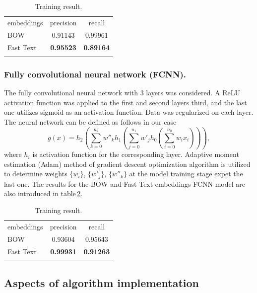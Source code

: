\documentclass[a4paper]{jpconf}
\begin{document}
\begin{table}[h!]
	\centering
	\caption{\label{tbl:01}Training result.}
	\begin{center}
		\begin{tabular}{lcc}
			\mr
			embeddings & precision & recall \\
			\mr
			BOW & 0.91143 & 0.99961 \\ \hline
			Fast Text & \bf 0.95523 & \bf 0.89164 \\ 
			\mr
		\end{tabular}
	\end{center}
\end{table}

\subsubsection*{Fully convolutional neural network (FCNN).}

The fully convolutional neural network with 3 layers was considered. A \textsf{ReLU} activation function was applied to the first and second layers third, and the last one utilizes \textsf{sigmoid} as an activation function. Data was regularized on each layer. The neural network can be defined as follows in our case
$$
g(x) = h_2 \left(\sum_{k=0}^{n_2} w''_k h_1\left(\sum_{j=0}^{n_1} w'_j h_0\left( \sum_{i=0}^{n_0} w_i x_i \right)\right)\right),
$$
where $h_i$ is activation function for the corresponding layer. Adaptive moment estimation (Adam) method of gradient descent optimization algorithm is utilized to determine weights $\{w_i\}$, $\{w'_j\}$, $\{w''_k\}$ at the model training stage expet the last one.
The results for the BOW and Fast Text embeddings FCNN model are also introduced in table\,\ref{tbl:02}.

\begin{table}[h!]
	\centering
	\caption{\label{tbl:02}Training result.}
	\begin{center}
		\begin{tabular}{lcc}
			\mr
			embeddings & precision & recall \\
			\mr
			BOW & 0.93604 & 0.95643 \\ \hline
			Fast Text & \bf 0.99931 & \bf 0.91263 \\ 
			\mr
		\end{tabular}
	\end{center}
\end{table}


\subsection{Aspects of algorithm implementation}
\end{document}

